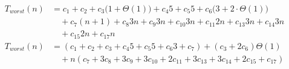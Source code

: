 \begin{subequations}
\label{eq:findlinesegments-3}
\begin{align}
\label{eq:findlinesegments-3-1}
T_{worst}(n)& =
c_{1}
+ c_{2}
+ c_{3}\bigl(1 + \Theta(1)\bigr)
+ c_{4}5
+ c_{5}5
+ c_{6}\bigl(3 + 2 \cdot \Theta(1)\bigr)
\\
& \quad
+ c_{7}(n+1)
+ c_{8}3n
+ c_{9}3n
+ c_{10}3n
+ c_{11}2n
+ c_{13}3n
+ c_{14}3n
\nonumber \\
& \quad
+ c_{15}2n
+ c_{17}n
\nonumber \\
\label{eq:findlinesegments-3-2}
T_{worst}(n)& =
(c_{1} + c_{2} + c_{3} + c_{4}5 + c_{5}5 + c_{6}3 + c_{7})
+ (c_{3} + 2c_{6})\Theta(1)
\\
& \quad
+ n(c_{7} + 3c_{8} + 3c_{9} + 3c_{10} + 2c_{11} + 3c_{13} + 3c_{14} + 2c_{15} + c_{17})
\nonumber
\end{align}
\end{subequations}
